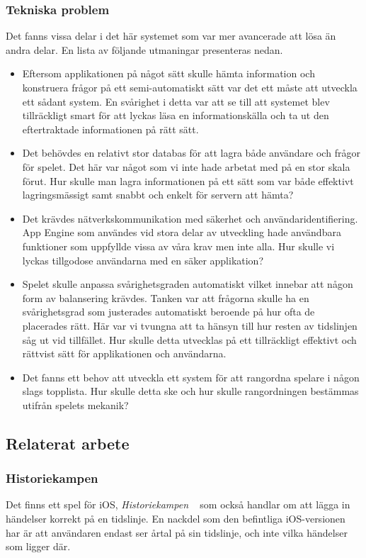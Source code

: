 \documentclass[a4paper, 11pt]{article}
\begin{document}
\subsubsection{Tekniska problem}
Det fanns vissa delar i det här systemet som var mer avancerade att lösa än andra delar. En lista av följande utmaningar presenteras nedan.
\begin{itemize}
\item Eftersom applikationen på något sätt skulle hämta information och konstruera frågor på ett semi-automatiskt sätt var det ett måste att utveckla ett sådant system. En svårighet i detta var att se till att systemet blev tillräckligt smart för att lyckas läsa en informationskälla och ta ut den eftertraktade informationen på rätt sätt.
\item Det behövdes en relativt stor databas för att lagra både användare och frågor för spelet. Det här var något som vi inte hade arbetat med på en stor skala förut. Hur skulle man lagra informationen på ett sätt som var både effektivt lagringsmässigt samt snabbt och enkelt för servern att hämta?
\item Det krävdes nätverkskommunikation med säkerhet och användaridentifiering. App Engine som användes vid stora delar av utveckling hade användbara funktioner som uppfyllde vissa av våra krav men inte alla. Hur skulle vi lyckas tillgodose användarna med en säker applikation?
\item Spelet skulle anpassa svårighetsgraden automatiskt vilket innebar att någon form av balansering krävdes. Tanken var att frågorna skulle ha en svårighetsgrad som justerades automatiskt beroende på hur ofta de placerades rätt. Här var vi tvungna att ta hänsyn till hur resten av tidslinjen såg ut vid tillfället. Hur skulle detta utvecklas på ett tillräckligt effektivt och rättvist sätt för applikationen och användarna.
\item Det fanns ett behov att utveckla ett system för att rangordna spelare i någon slags topplista. Hur skulle detta ske och hur skulle rangordningen bestämmas utifrån spelets mekanik? 
\end{itemize}

\subsection{Relaterat arbete}

\subsubsection{Historiekampen}
Det finns ett spel för iOS, \textit{Historiekampen} ~\cite{historiekampen} som också handlar om att lägga in händelser korrekt på en tidslinje. En nackdel som den befintliga iOS-versionen har är att användaren endast ser årtal på sin tidslinje, och inte vilka händelser som ligger där.
\end{document}
